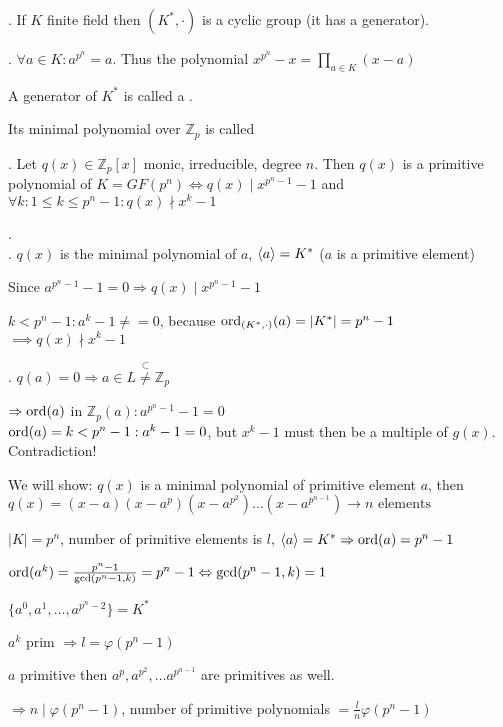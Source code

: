 \Theorem.
If $K$ finite field then $(K^{*},\cdot)$ is a cyclic group (it has a generator).

\Corollary.
$\forall a \in K: a^{p^n} = a$. Thus the polynomial $x^{p^n} -x = \prod_{a\in K}(x-a)$

\begin{definition}
  A generator of $K^{*}$ is called a .

  Its minimal polynomial over $\mathbb{Z}_p$ is called 
\end{definition}

\Theorem.
Let $q(x) \in \mathbb{Z}_p[x]$ monic, irreducible, degree $n$. Then $q(x)$ is a primitive polynomial of $K = GF(p^n) \iff q(x) ∣ x^{p^n -1}-1$ and $\forall k : 1 \leq k \leq p^n-1: q(x) \nmid x^k-1$

\Proof. \\
\ProofForward.
$q(x)$ is the minimal polynomial of $a$, $\left\langle a \right\rangle = K^{*}$ ($a$ is a primitive element)

Since $a^{p^n-1}-1 = 0 \Rightarrow q(x)∣x^{p^n-1}-1$

$k < p^n-1: a^k -1 \neq = 0$, because $\operatorname{ord}_{(K^{*}, \cdot)} (a) = | K^{*}| = p^n-1$ \\
$\implies q(x) \nmid x^k -1$

\ProofBackward.
$q(a) = 0 \Rightarrow a \in L \stackrel{\subset}{\neq} \mathbb{Z}_p$

$\Rightarrow \operatorname{ord}(a)$ in $\mathbb{Z}_p(a): a^{p^n-1}-1 = 0$ \\
$\operatorname{ord}(a) = k < p^n -1: a^k -1 = 0$, but $x^k-1$ must then be a multiple of $g(x)$. Contradiction!


We will show: $q(x)$ is a minimal polynomial of primitive element $a$, then $q(x) = (x- a)(x-a^p)(x-a^{p^2}) \ldots (x-a^{p^{n-1}}) \rightarrow n \text{ elements}$

$|K| = p^n$, number of primitive elements is $l$, $\left\langle a \right\rangle = K^{*} \Rightarrow \operatorname{ord}(a) = p^n-1$

$\operatorname{ord}(a^k) = \frac{p^n-1}{\gcd(p^n-1,k)} = p^n-1 \Leftrightarrow \gcd(p^n-1,k) = 1$

$\{a^0, a^1, \ldots, a^{p^n-2}\} = K^{*}$

$a^k$ prim $\Rightarrow l = \varphi(p^n-1)$

$a$ primitive then $a^p, a^{p^2}, \ldots a^{p^{n-1}}$ are primitives as well.

$\Rightarrow n∣ \varphi(p^n-1)$, number of primitive polynomials $= \frac{l}{n} \varphi(p^n-1)$

